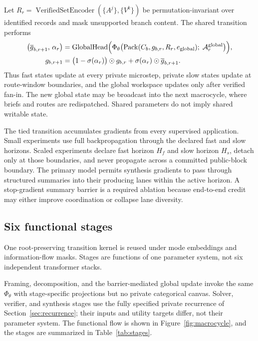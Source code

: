 \documentclass[10pt,a4paper]{article}
\newcommand{\op}[1]{\operatorname{#1}}
\newcommand{\Acal}{\mathcal{A}}
\begin{document}
Let $R_r = \op{VerifiedSetEncoder}(\{A^j\}, \{V^k\})$ be permutation-invariant
over identified records and mask unsupported branch content. The shared
transition performs
\begin{align}
\bigl( \overline{g}_{b,r+1},\, \alpha_r \bigr) &=
  \op{GlobalHead}\Bigl( \Phi_\theta\bigl( \op{Pack}( C_b, g_{b,r}, R_r,
  e_{\mathrm{global}} );\; \Acal^{\mathrm{global}}_r \bigr) \Bigr), \\
g_{b,r+1} &= \bigl( 1 - \sigma(\alpha_r) \bigr) \odot g_{b,r}
  + \sigma(\alpha_r) \odot \overline{g}_{b,r+1} .
\end{align}
Thus fast states update at every private microstep, private slow states update
at route-window boundaries, and the global workspace updates only after
verified fan-in. The new global state may be broadcast into the next
macrocycle, where briefs and routes are redispatched. Shared parameters do not
imply shared writable state.

The tied transition accumulates gradients from every supervised application.
Small experiments use full backpropagation through the declared fast and slow
horizons. Scaled experiments declare fast horizon $H_f$ and slow horizon
$H_s$, detach only at those boundaries, and never propagate across a committed
public-block boundary. The primary model permits synthesis gradients to pass
through structured summaries into their producing lanes within the active
horizon. A stop-gradient summary barrier is a required ablation because
end-to-end credit may either improve coordination or collapse lane diversity.

\subsection{Six functional stages}

One root-preserving transition kernel is reused under mode embeddings and
information-flow masks. Stages are functions of one parameter system, not six
independent transformer stacks.

Framing, decomposition, and the barrier-mediated global update invoke the same
$\Phi_\theta$ with stage-specific projections but no private categorical
canvas. Solver, verifier, and synthesis stages use the fully specified private
recurrence of Section~\ref{sec:recurrence}; their inputs and utility targets
differ, not their parameter system. The functional flow is shown in
Figure~\ref{fig:macrocycle}, and the stages are summarized in
Table~\ref{tab:stages}.
\end{document}
